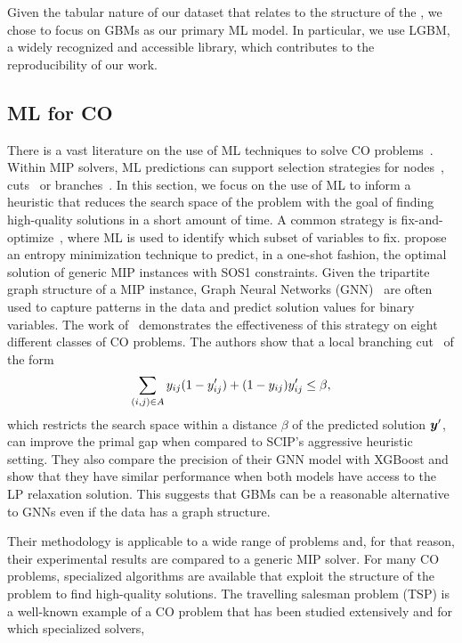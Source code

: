 \documentclass[3p, authoryear, times, doubleblind]{elsarticle}
\begin{document}
{Given the tabular nature of our dataset that relates to the structure of the \fcn, we chose to focus on GBMs as our primary ML model. In particular, we use LGBM, a widely recognized and accessible library, which contributes to the reproducibility of our work. 


\subsection{ML for CO}
There is a vast literature on the use of ML techniques to solve CO problems~\citep{dai_learning_2017, bengio_machine_2021, kotary_learning_2021}. Within MIP solvers, ML predictions can support selection strategies for nodes~\citep{khalil_mip-gnn_2022}, cuts~\citep{turner_adaptive_2023} or branches~\citep{khalil_learning_2016, lodi_learning_2017}. In this section, we focus on the use of ML to inform a heuristic that reduces the search space of the problem with the goal of finding high-quality solutions in a short amount of time. A common strategy is fix-and-optimize~\citep{hanafi_mathematical_2017}, where ML is used to identify which subset of variables to fix. \cite{robinson_la_rocca_one-shot_2024} propose an entropy minimization technique to predict, in a one-shot fashion, the optimal solution of generic MIP instances with SOS1 constraints. Given the tripartite graph structure of a MIP instance, Graph Neural Networks (GNN)~\citep{hamilton_graph_2020, liu_machine_2022} are often used to capture patterns in the data and predict solution values for binary variables. The  work of~\cite{ding_accelerating_2020} demonstrates the effectiveness of this strategy on eight  different classes of CO problems. The authors show that a local branching cut~\citep{fischetti_local_2003} of the form
\begin{align}\label{eq:localbranching}
    \sum_{(i,j) \in A} y_{ij}  (1 - y_{ij}') + (1 - y_{ij}) y_{ij}' \leq \beta, 
\end{align} %
which restricts the search space within a distance $\beta$ of the predicted solution $\boldsymbol{y}'$, can improve the primal gap when compared to SCIP's aggressive heuristic setting. They also compare the precision of their GNN model with XGBoost and show that they have similar performance when both models have access to the LP relaxation solution. This suggests that GBMs can be a reasonable alternative to GNNs even if the data has a graph structure.  


Their methodology is applicable to a wide range of problems and, for that reason, their experimental results are compared to a generic MIP solver. For many CO problems, specialized algorithms are available that exploit the structure of the problem to find high-quality solutions. The travelling salesman problem (TSP) is a well-known example of a CO problem that has been studied extensively and for which specialized solvers, 

}
\end{document}
